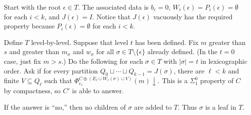 \documentclass{article}
\newcommand{\converge}{\!\!\downarrow}
\def\qt#1{``#1''}%
\numberwithin{theorem}{section}
\begin{document}
Start with the root $\epsilon \in T$.  The associated data is $b_\epsilon = 0$, $W_i(\epsilon) = P_i(\epsilon) = \emptyset$ for each $i < k$, and $J(\epsilon) = I$.  Notice that $J(\epsilon)$ vacuously has the required property because $P_i(\epsilon) = \emptyset$ for each $i < k$.

Define $T$ level-by-level.  Suppose that level $t$ has been defined.  Fix $m$ greater than $s$ and greater than $m_\sigma$ and $w_\sigma$ for all $\sigma \in T \setminus \{\epsilon\}$ already defined.  (In the $t=0$ case, just fix $m > s$.)  Do the following for each $\sigma \in T$ with $|\sigma| = t$ in lexicographic order.  Ask if for every partition $Q_0 \sqcup \cdots \sqcup Q_{k-1} = J(\sigma)$, there are $\ell < k$ and finite $V \subseteq Q_\ell$ such that $\Phi_{e_\ell}^{C \oplus (E_\ell \cup W_\ell(\sigma) \cup V)}(m)\converge$.  This is a $\Sigma^0_1$ property of $C$ by compactness, so $C'$ is able to answer.

If the answer is \qt{no,} then no children of $\sigma$ are added to $T$.  Thus $\sigma$ is a leaf in $T$.
\end{document}
